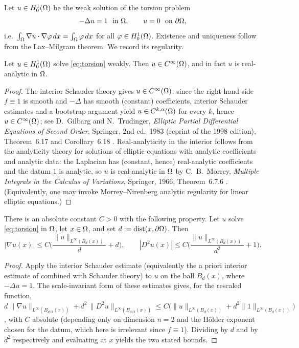 Let $u\in H^1_0(\Omega)$ be the weak solution of the torsion problem
\begin{equation}\label{eq:torsion}
  -\Delta u=1\ \text{ in }\Omega,\qquad u=0\ \text{ on }\partial\Omega,
\end{equation}
i.e.\ $\int_\Omega\nabla u\cdot\nabla\varphi\,dx=\int_\Omega\varphi\,dx$ for all
$\varphi\in H^1_0(\Omega)$. Existence and uniqueness follow from the
Lax--Milgram theorem. We record its regularity.

\begin{theorem}\label{thm:torsion-regularity}
Let $u\in H^1_0(\Omega)$ solve \eqref{eq:torsion} weakly. Then
$u\in C^\infty(\Omega)$, and in fact $u$ is real-analytic in $\Omega$.
\end{theorem}

\begin{proof}
The interior Schauder theory gives $u\in C^\infty(\Omega)$: since the right-hand
side $f\equiv 1$ is smooth and $-\Delta$ has smooth (constant) coefficients,
interior Schauder estimates and a bootstrap argument yield
$u\in C^{k,\alpha}(\Omega)$ for every $k$, hence $u\in C^\infty(\Omega)$; see
D.~Gilbarg and N.~Trudinger, \emph{Elliptic Partial Differential Equations
of Second Order}, Springer, 2nd ed.\ 1983 (reprint of the 1998 edition),
Theorem~6.17 and Corollary~6.18 \cite{GT1983}. Real-analyticity in
the interior follows from the analyticity theory for solutions of elliptic
equations with analytic coefficients and analytic data: the Laplacian has
(constant, hence) real-analytic coefficients and the datum $1$ is analytic, so
$u$ is real-analytic in $\Omega$ by C.~B.~Morrey, \emph{Multiple Integrals in
the Calculus of Variations}, Springer, 1966, Theorem~6.7.6 \cite{Morrey1966}.
(Equivalently, one may invoke Morrey--Nirenberg analytic regularity for linear
elliptic equations.)
\end{proof}

\begin{theorem}
\label{thm:interior-estimates}
There is an absolute constant $C>0$ with the following property. Let $u$ solve
\eqref{eq:torsion} in $\Omega$, let $x\in\Omega$, and set
$d:=\operatorname{dist}(x,\partial\Omega)$. Then
\[
  |\nabla u(x)|\le C\Big(\frac{\|u\|_{L^\infty(B_d(x))}}{d}+d\Big),
  \qquad
  |D^2 u(x)|\le C\Big(\frac{\|u\|_{L^\infty(B_d(x))}}{d^2}+1\Big).
\]
\end{theorem}

\begin{proof}
Apply the interior Schauder estimate
\cite[Theorem~6.2, see also Corollary~6.3]{GT1983} (equivalently the
a priori interior estimate of \cite[Theorem~3.9]{GT1983} combined
with Schauder theory) to $u$ on the ball $B_d(x)$, where $-\Delta u=1$. The
scale-invariant form of these estimates gives, for the rescaled function,
$d\,\|\nabla u\|_{L^\infty(B_{d/2}(x))}
 +d^2\,\|D^2u\|_{L^\infty(B_{d/2}(x))}
 \le C\big(\|u\|_{L^\infty(B_d(x))}+d^2\|1\|_{L^\infty(B_d(x))}\big)$,
with $C$ absolute (depending only on dimension $n=2$ and the H\"older exponent
chosen for the datum, which here is irrelevant since $f\equiv1$). Dividing by
$d$ and by $d^2$ respectively and evaluating at $x$ yields the two stated
bounds.
\end{proof}

